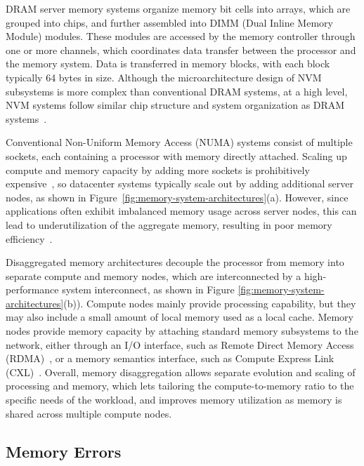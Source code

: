 DRAM server memory systems organize memory bit cells into arrays, which are grouped into chips, and further assembled into DIMM (Dual Inline Memory Module) modules. 
These modules are accessed by the memory controller through one or more channels, which coordinates data transfer between the processor and the memory system.
Data is transferred in memory blocks, with each block typically 64 bytes in size.
Although the microarchitecture design of NVM subsystems is more complex than conventional DRAM systems, at a high level, NVM systems follow similar chip structure and system organization as DRAM systems~\cite{yang:optane-guide:fast:2020, wang:model-nvm:micro:2020}.

Conventional Non-Uniform Memory Access (NUMA) systems consist of multiple sockets, each containing a processor with memory directly attached. 
Scaling up compute and memory capacity by adding more sockets is prohibitively expensive~\cite{barroso:wsc:book:2018, lim:memory-blade:isca:2009}, so datacenter systems typically scale out by adding additional server nodes, as shown in Figure~\ref{fig:memory-system-architectures}(a). 
However, since applications often exhibit imbalanced memory usage across server nodes, this can lead to underutilization of the aggregate memory, resulting in poor memory efficiency~\cite{lu:pond:asplos:2023, gu:infiniswap:nsdi:2017}.

Disaggregated memory architectures decouple the processor from memory into separate compute and memory nodes, which are interconnected by a high-performance system interconnect, as shown in  Figure \ref{fig:memory-system-architectures}(b)). 
Compute nodes mainly provide processing capability, but they may also include a small amount of local memory used as a local cache.
Memory nodes provide memory capacity by attaching standard memory subsystems to the network, either through an I/O interface, such as Remote Direct Memory Access (RDMA)~\cite{rdma-consortium}, or a memory semantics interface, such as Compute Express Link (CXL)~\cite{cxl-consortium}.
Overall, memory disaggregation allows separate evolution and scaling of processing and memory, which lets tailoring the compute-to-memory ratio to the specific needs of the workload, and improves memory utilization as memory is shared across multiple compute nodes.

\subsection{Memory Errors}
\label{sec:failure-model}


